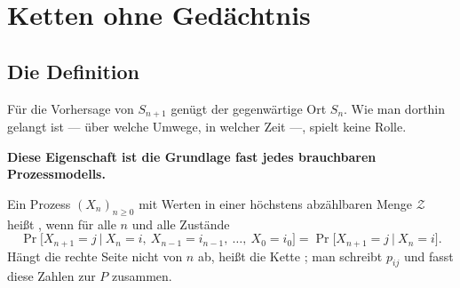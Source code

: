 \chapter{Ketten ohne Gedächtnis}

\section{Die Definition}

\begin{merksatz}
Für die Vorhersage von $S_{n+1}$ genügt der gegenwärtige Ort $S_n$. Wie man dorthin gelangt ist --- über welche Umwege, in welcher Zeit ---, spielt keine Rolle.

\begin{center}
\begin{minipage}{0.9\textwidth}
\textbf{Diese Eigenschaft ist die Grundlage fast jedes brauchbaren Prozessmodells.}
\end{minipage}
\end{center}
\end{merksatz}

\begin{definition}
Ein Prozess $(X_n)_{n\ge0}$ mit Werten in einer höchstens abzählbaren Menge $\mathcal Z$ heißt , wenn für alle $n$ und alle Zustände
\[ \Pr\bigl[X_{n+1} = j \ \big|\ X_n = i,\ X_{n-1} = i_{n-1},\ \ldots,\ X_0 = i_0\bigr] = \Pr\bigl[X_{n+1} = j \ \big|\ X_n = i\bigr] . \]
Hängt die rechte Seite nicht von $n$ ab, heißt die Kette ; man schreibt $p_{ij}$ und fasst diese Zahlen zur  $P$ zusammen.
\end{definition}

